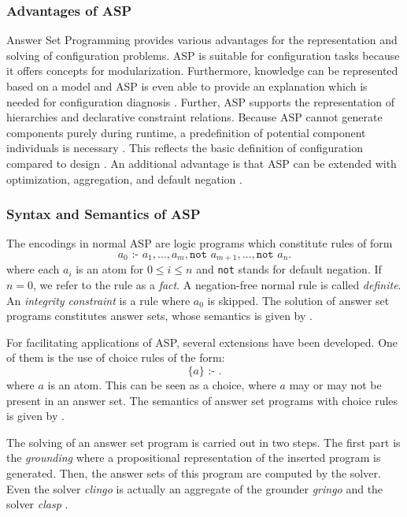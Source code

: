 \subsubsection{Advantages of ASP}
Answer Set Programming provides various advantages for the representation and solving of configuration problems.
ASP is suitable for configuration tasks because it offers concepts for modularization.
Furthermore, knowledge can be represented based on a model and ASP is even able to provide an explanation which is needed for configuration diagnosis \cite{hofestrybawo14a}. Further, ASP supports the representation of hierarchies and declarative constraint relations. Because ASP cannot generate components purely during runtime, a predefinition of potential component individuals is necessary \cite{fefaateruraz17a}. This reflects the basic definition of configuration compared to design \cite{brown98}. An additional advantage is that ASP can be extended with optimization, aggregation, and default negation \cite{faryscsc15a}.

\subsubsection{Syntax and Semantics of ASP}

The encodings in normal ASP are logic programs which constitute rules of form 
\[
a_0 \texttt{ :- } a_1,\dots,a_m,\texttt{not } a_{m+1},\dots,\texttt{not } a_n.
\]
where each $a_i$ is an atom for $0\leq i \leq n$ and \texttt{not} stands for default negation.
If $n=0$, we refer to the rule as a \emph{fact}.
A negation-free normal rule is called \emph{definite}.
An \emph{integrity constraint} is a rule where $a_0$ is skipped.
The solution of answer set programs constitutes answer sets, whose semantics is given by \cite{gellif88b}.
\newline

For facilitating applications of ASP, several extensions have been developed.
One of them is the use of choice rules of the form:
\[\{a\}\texttt{ :- }.\]
where $a$ is an atom.
This can be seen as a choice, where $a$ may or may not be present in an answer set.
The semantics of answer set programs with choice rules is given by \cite{simons00a}.
\newline

The solving of an answer set program is carried out in two steps.
The first part is the \textit{grounding} where a propositional representation of the inserted program is generated.
Then, the answer sets of this program are computed by the solver. 
Even the solver \textit{clingo} is actually an aggregate of the grounder \textit{gringo} and the solver \textit{clasp} \cite{gekakasc14a}.

